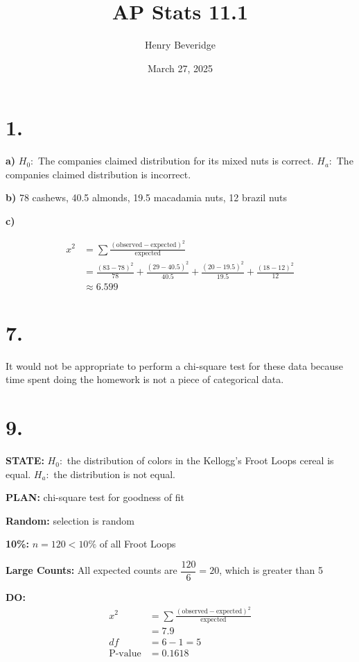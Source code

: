 \documentclass{article}
\title{AP Stats 11.1}
\author{Henry Beveridge}
\date{March 27, 2025}
\begin{document}
\maketitle

\section*{1.}
\textbf{a)} $H_0:$ The companies claimed distribution for its mixed nuts is correct. $H_a:$ The companies claimed distribution is incorrect.


\noindent\textbf{b)} 78 cashews, 40.5 almonds, 19.5 macadamia nuts, 12 brazil nuts


\noindent\textbf{c)} 

\begin{align*}
    x^2 &= \sum\frac{(\text{observed}-\text{expected})^2}{\text{expected}} \\
    &= \frac{(83-78)^2}{78}+\frac{(29-40.5)^2}{40.5} + \frac{(20-19.5)^2}{19.5} + \frac{(18-12)^2}{12} \\
    &\approx 6.599
\end{align*}

\section*{7.}
It would not be appropriate to perform a chi-square test for these data because time spent doing the homework is not a piece of categorical data.

\section*{9.}
\textbf{STATE:} $H_0:$ the distribution of colors in the Kellogg's Froot Loops cereal is equal. $H_a:$ the distribution is not equal.

\noindent\textbf{PLAN:} chi-square test for goodness of fit

\textbf{Random:} selection is random

\textbf{10\%:} $n=120<10\%$ of all Froot Loops

\textbf{Large Counts:} All expected counts are $\dfrac{120}{6}=20$, which is greater than 5

\noindent\textbf{DO:}
\begin{align*}
    x^2&=\sum\frac{(\text{observed}-\text{expected})^2}{\text{expected}} \\
    &= 7.9 \\
    df &= 6-1=5\\
    \text{P-value} &= 0.1618 \\
\end{align*}
\end{document}
